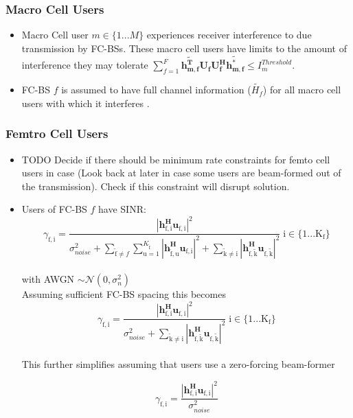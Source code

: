 \documentclass[12pt]{article}
\begin{document}
\subsubsection{Macro Cell Users}

\begin{itemize}
\item 
Macro Cell user $m \in \{1 ... M\}$ experiences receiver interference to due transmission by FC-BSs. These macro cell users have limits to the amount of interference they may tolerate 
$\sum^F_{f=1} \mathbf{\tilde{h_{m,f}^T}}  \mathbf{U_f}  \mathbf{U_f^H} \mathbf{\tilde{h_{m,f}^*}} \leq I^{Threshold}_{m} $.

\item FC-BS $f$ is assumed to have full channel information ($\tilde{H_f}$) for all macro cell users with which it interferes .
\\
\end{itemize}

\subsubsection{Femtro Cell Users}
\begin{itemize}


\item TODO Decide if there should be minimum rate constraints for femto cell users in case (Look back at later in case some users are beam-formed out of the transmission). Check if this constraint will disrupt solution.
\\

\item Users of FC-BS $f$ have SINR:
\begin{equation}
\gamma_{\mathrm{f,i}} = \frac{|\mathbf{h^H_{\mathrm{f,i}}u_{\mathrm{f,i}}}|^2}
{\sigma^2_{noise}   + \sum_{\mathrm{\tilde{f}}\neq f} \sum_{\mathrm{u=1}}^{K_{\mathrm{\tilde{f}}}}
|\mathbf{h^H_{\mathrm{\tilde{f},u}}u_{\mathrm{f,i}}}|^2
 + \sum_{\mathrm{\tilde{k}\neq i}}
  |\mathbf{h^H_{\mathrm{f,\tilde{k}}}u_{\mathrm{f,\tilde{k}}}}|^2}
  \; \mathrm{i \in \{1 ... K_f\}}
\end{equation}
\\
with AWGN $\sim \mathcal{N}(0,\sigma^2_n)$
\\

Assuming sufficient FC-BS spacing this becomes 
\begin{equation}
\gamma_{\mathrm{f,i}} = \frac{|\mathbf{h^H_{\mathrm{f,i}}u_{\mathrm{f,i}}}|^2}
{\sigma^2_{noise} 
 + \sum_{\mathrm{\tilde{k}\neq i}}
  |\mathbf{h^H_{\mathrm{f,\tilde{k}}}u_{\mathrm{f,\tilde{k}}}}|^2}
  \; \mathrm{i \in \{1 ... K_f\}}
\end{equation}
\\

This further simplifies assuming that users use a zero-forcing beam-former

\begin{equation}\label{zf_snr}
\gamma_{\mathrm{f,i}} = \frac{|\mathbf{h^H_{\mathrm{f,i}}u_{\mathrm{f,i}}}|^2}
{\sigma^2_{noise}  
}
\end{equation}
\\

\end{itemize}
\end{document}
